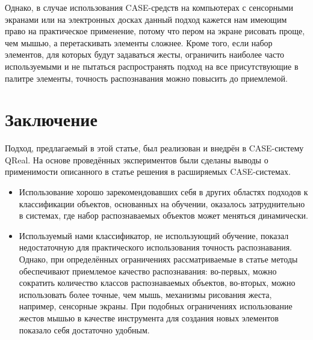 \documentclass[a5paper]{article}
\begin{document}
Однако, в случае использования CASE-средств на компьютерах с сенсорными экранами или на электронных досках данный подход кажется нам имеющим право на практическое применение, потому что пером на экране рисовать проще, чем мышью, а перетаскивать элементы сложнее. Кроме того, если набор элементов, для которых будут задаваться жесты, ограничить наиболее часто используемыми и не пытаться распространять подход на все присутствующие в палитре элементы, точность распознавания можно повысить до приемлемой.

\section{Заключение}
Подход, предлагаемый в этой статье, был реализован и внедрён в CASE-систему QReal. На основе проведённых экспериментов были сделаны выводы о применимости описанного в статье решения в расширяемых CASE-системах.
\begin{itemize}
  \item Использование хорошо зарекомендовавших себя в других областях подходов к классификации объектов, основанных на обучении, оказалось затруднительно в системах, где набор распознаваемых объектов может меняться динамически.
  \item Используемый нами классификатор, не использующий обучение, показал недостаточную для практического использования точность распознавания. Однако, при определённых ограничениях рассматриваемые в статье методы обеспечивают приемлемое качество распознавания: во-первых, можно сократить количество классов  распознаваемых объектов, во-вторых, можно использовать более точные, чем мышь, механизмы рисования жеста, например, сенсорные экраны. При подобных ограничениях использование жестов мышью в качестве инструмента для создания новых элементов показало себя достаточно удобным.
\end{itemize}

\pagebreak
\end{document}

